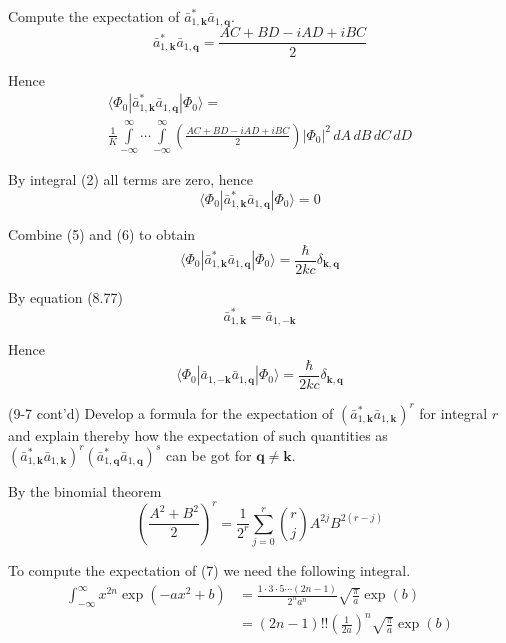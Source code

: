 \documentclass[12pt]{article}
\newcommand\U{\vert\Phi_0\vert^2}
\begin{document}
Compute the expectation of $\bar a_{1,\mathbf k}^*\bar a_{1,\mathbf q}$.
\begin{equation*}
\bar a_{1,\mathbf k}^*\bar a_{1,\mathbf q}
=\frac{AC+BD-iAD+iBC}{2}
\end{equation*}

Hence
\begin{multline*}
\langle\Phi_0|\bar a_{1,\mathbf k}^*\bar a_{1,\mathbf q}|\Phi_0\rangle=
\\
\frac{1}{K}\int\limits_{-\infty}^\infty\cdots\int\limits_{-\infty}^\infty
\left(\frac{AC+BD-iAD+iBC}{2}\right)
\U\,dA\,dB\,dC\,dD
\end{multline*}

By integral (2) all terms are zero, hence
\begin{equation*}
\langle\Phi_0|\bar a_{1,\mathbf k}^*\bar a_{1,\mathbf q}|\Phi_0\rangle=0
\tag{6}
\end{equation*}

Combine (5) and (6) to obtain
\begin{equation*}
\langle\Phi_0|\bar a_{1,\mathbf k}^*\bar a_{1,\mathbf q}|\Phi_0\rangle=\frac{\hbar}{2kc}\delta_{\mathbf k,\mathbf q}
\end{equation*}

By equation (8.77)
\begin{equation*}
\bar a_{1,\mathbf k}^*=\bar a_{1,-\mathbf k}
\end{equation*}

Hence
\begin{equation*}
\langle\Phi_0|\bar a_{1,-\mathbf k}\bar a_{1,\mathbf q}|\Phi_0\rangle=\frac{\hbar}{2kc}\delta_{\mathbf k,\mathbf q}
\end{equation*}

(9-7 cont'd)
Develop a formula for the expectation of
$(\bar a_{1,\mathbf k}^*\bar a_{1,\mathbf k})^r$
for integral $r$ and explain thereby how the expectation of such
quantities as
$(\bar a_{1,\mathbf k}^*\bar a_{1,\mathbf k})^r
(\bar a_{1,\mathbf q}^*\bar a_{1,\mathbf q})^s$
can be got for $\mathbf q\ne\mathbf k$.

\bigskip
By the binomial theorem
\begin{equation*}
\left(\frac{A^2+B^2}{2}\right)^r=\frac{1}{2^r}\sum_{j=0}^r\binom{r}{j}A^{2j}B^{2(r-j)}
\tag{7}
\end{equation*}

To compute the expectation of (7) we need the following integral.
\begin{align*}
\int_{-\infty}^\infty x^{2n}\exp(-ax^2+b)
&=\frac{1\cdot3\cdot5\cdots(2n-1)}{2^na^n}\sqrt{\frac{\pi}{a}}\exp(b)
\\
&=(2n-1)!!
\left(\frac{1}{2a}\right)^n
\sqrt{\frac{\pi}{a}}\exp(b)
\tag{8}
\end{align*}
\end{document}
